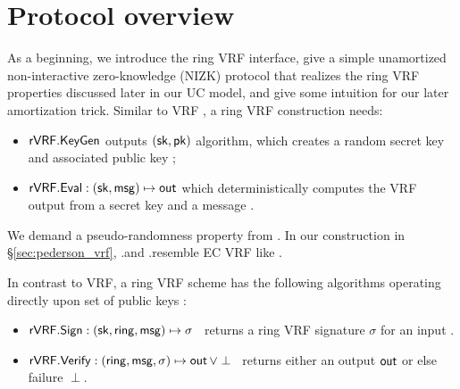 \section{Protocol overview}
\label{sec:overview}

As a beginning, we introduce the ring VRF interface, give a simple
unamortized non-interactive zero-knowledge (NIZK) protocol that
realizes the ring VRF properties discussed later in our UC model,
and give some intuition for our later amortization trick.
Similar to VRF \cite{vrf_micali}, a ring VRF construction needs: 

\begin{itemize}
\item ${\mathsf{rVRF}}.{\mathsf{KeyGen}} $ outputs $ (\mathsf{sk}, \mathsf{pk})$ algorithm,
 which creates a random secret key \sk and associated public key \pk;

\item ${\mathsf{rVRF}}.{\mathsf{Eval}} : (\mathsf{sk},\mathsf{msg}) \mapsto {\ensuremath{\mathsf{out}}}$ which deterministically computes the VRF output \Out from a secret key \sk and a message \msg.
\end{itemize}
%


We demand a pseudo-randomness property from \Eval. In our construction in \S\ref{sec:pederson_vrf},  \rVRF.\KeyGen and \rVRF.\Eval resemble EC VRF like \cite{nsec5,VXEd25519,draft-irtf-cfrg-vrf-10}.


In contrast to VRF, a ring VRF scheme has the following algorithms operating directly upon
 set of public keys \ring:
\begin{itemize}
\item ${\mathsf{rVRF}}.{\mathsf{Sign}} : (\mathsf{sk},\mathsf{ring},\mathsf{msg}) \mapsto \sigma$ \,
    returns a ring VRF signature $\sigma$ for an input \msg.
\item ${\mathsf{rVRF}}.{\mathsf{Verify}} : (\mathsf{ring},\mathsf{msg},\sigma) \mapsto {\ensuremath{\mathsf{out}}} \, \lor \perp$ \,
    returns either an output ${\mathsf{out}}$ or else failure $\perp$.
\end{itemize}

